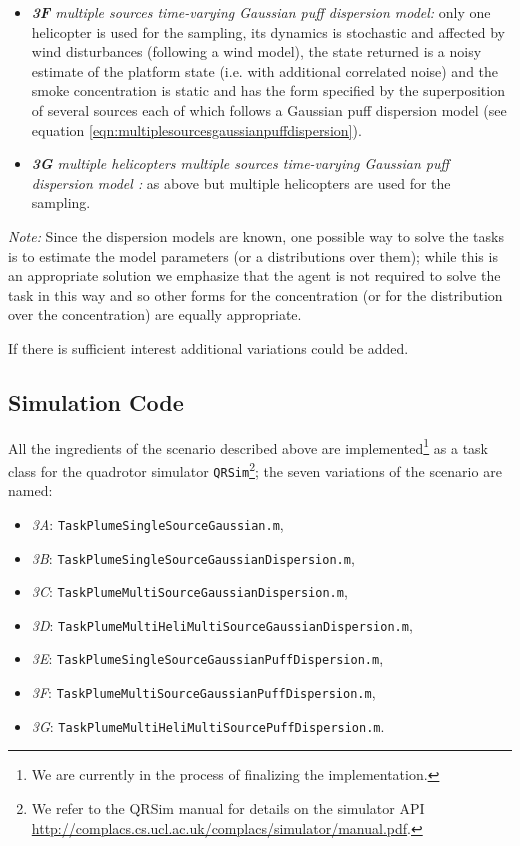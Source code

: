 \documentclass[a4paper,11pt]{report}
\newcommand{\webman}{\url{http://complacs.cs.ucl.ac.uk/complacs/simulator/manual.pdf}\xspace}
\newcommand\mytexttt[1]{\texttt{\hyphenchar\font=45\relax #1}}
\begin{document}
\begin{itemize}
\item \textit{\textbf{3F} multiple sources time-varying Gaussian puff dispersion model:} only one helicopter is used for the sampling, its dynamics is stochastic and affected by wind disturbances (following a wind model), the state returned is a noisy estimate of the platform state (i.e. with additional correlated noise) and the smoke concentration is static and has the form specified by the superposition of several sources each of which follows a Gaussian puff dispersion model (see equation \ref{eqn:multiplesourcesgaussianpuffdispersion}).

\item \textit{\textbf{3G} multiple helicopters multiple sources time-varying Gaussian puff dispersion model :} as above but multiple helicopters are used for the sampling.

\end{itemize}

\textit{Note:}
Since the dispersion models are known, one possible way to solve the tasks is to estimate the model parameters (or a distributions over them); while this is an appropriate solution we emphasize that the agent is not required to solve the task in this way and so other forms for the concentration (or for the distribution over the concentration) are equally appropriate.  

If there is sufficient interest additional variations could be added.

\subsection{Simulation Code} \label{PlumeSim}

All the ingredients of the scenario described above are implemented\footnote{We are currently in the process of finalizing the implementation.} as a task class for the quadrotor simulator \texttt{QRSim}\footnote{We refer to the QRSim manual for details on the simulator API \webman.}; the seven variations of the scenario are named:
\begin{itemize}
\item\textit{3A}: \mytexttt{TaskPlumeSingleSourceGaussian.m}, 
\item\textit{3B}: \mytexttt{TaskPlumeSingleSourceGaussianDispersion.m},
\item\textit{3C}: \mytexttt{TaskPlumeMultiSourceGaussianDispersion.m}, 
\item\textit{3D}: \mytexttt{TaskPlumeMultiHeliMultiSourceGaussianDispersion.m}, 
\item\textit{3E}: \mytexttt{TaskPlumeSingleSourceGaussianPuffDispersion.m}, 
\item\textit{3F}: \mytexttt{TaskPlumeMultiSourceGaussianPuffDispersion.m},
\item\textit{3G}: \mytexttt{TaskPlumeMultiHeliMultiSourcePuffDispersion.m}. 
\end{itemize}
\end{document}
